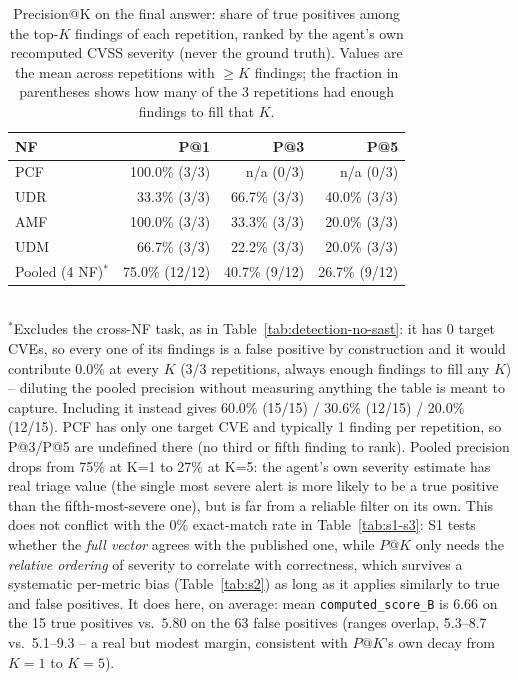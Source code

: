 \begin{table}[t]
\centering
\caption{Precision@K on the final answer: share of true positives among the top-$K$ findings of each repetition, ranked by the agent's own recomputed CVSS severity (never the ground truth). Values are the mean across repetitions with $\geq K$ findings; the fraction in parentheses shows how many of the 3 repetitions had enough findings to fill that $K$.}
\label{tab:precision-at-k}
\begin{tabular}{lrrr}
\toprule
NF & P@1 & P@3 & P@5 \\
\midrule
PCF & 100.0\% (3/3) & n/a (0/3) & n/a (0/3) \\
UDR & 33.3\% (3/3)  & 66.7\% (3/3) & 40.0\% (3/3) \\
AMF & 100.0\% (3/3) & 33.3\% (3/3) & 20.0\% (3/3) \\
UDM & 66.7\% (3/3)  & 22.2\% (3/3) & 20.0\% (3/3) \\
\midrule
Pooled (4 NF)$^{*}$ & 75.0\% (12/12) & 40.7\% (9/12) & 26.7\% (9/12) \\
\bottomrule
\end{tabular}
\\[2pt]
\footnotesize{$^{*}$Excludes the cross-NF task, as in Table~\ref{tab:detection-no-sast}: it has 0 target CVEs, so every one of its findings is a false positive by construction and it would contribute 0.0\% at every $K$ (3/3 repetitions, always enough findings to fill any $K$) -- diluting the pooled precision without measuring anything the table is meant to capture. Including it instead gives 60.0\% (15/15) / 30.6\% (12/15) / 20.0\% (12/15). PCF has only one target CVE and typically 1 finding per repetition, so P@3/P@5 are undefined there (no third or fifth finding to rank). Pooled precision drops from 75\% at K=1 to 27\% at K=5: the agent's own severity estimate has real triage value (the single most severe alert is more likely to be a true positive than the fifth-most-severe one), but is far from a reliable filter on its own. This does not conflict with the 0\% exact-match rate in Table~\ref{tab:s1-s3}: S1 tests whether the \emph{full vector} agrees with the published one, while $P@K$ only needs the \emph{relative ordering} of severity to correlate with correctness, which survives a systematic per-metric bias (Table~\ref{tab:s2}) as long as it applies similarly to true and false positives. It does here, on average: mean \texttt{computed\_score\_B} is $6.66$ on the 15 true positives vs.\ $5.80$ on the 63 false positives (ranges overlap, 5.3--8.7 vs.\ 5.1--9.3 -- a real but modest margin, consistent with $P@K$'s own decay from $K{=}1$ to $K{=}5$).}

\end{table}
